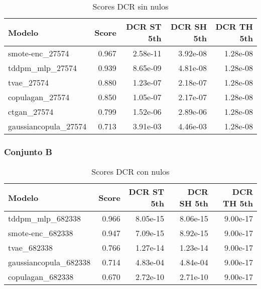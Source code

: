    \begin{table}[H]
    \centering
    \caption{Scores DCR sin nulos}
    \label{dcr-eco-a-scores}
    \begin{tabular}{|l|r|r|r|r|}
        \hline
        \rowcolor[gray]{0.8}
        Modelo & \textbf{Score} & DCR ST 5th & DCR SH 5th & DCR TH 5th \\ \hline
       smote-enc\_27574         & 0.967 & 2.58e-11 & 3.92e-08 & 1.28e-08 \\ \hline
       tddpm\_mlp\_27574        & 0.939 & 8.65e-09 & 4.81e-08 & 1.28e-08 \\ \hline
       tvae\_27574              & 0.880 & 1.23e-07 & 2.18e-07 & 1.28e-08 \\ \hline
       copulagan\_27574         & 0.850 & 1.05e-07 & 2.17e-07 & 1.28e-08 \\ \hline
       ctgan\_27574             & 0.799 & 1.52e-06 & 2.89e-06 & 1.28e-08 \\ \hline
       gaussiancopula\_27574    & 0.713 & 3.91e-03 & 4.46e-03 & 1.28e-08 \\ \hline
    \end{tabular}
\end{table}


\subsubsection{Conjunto B}
\label{ds-conjunto-b}

\begin{table}[H]
    \centering
    \caption{Scores DCR con nulos}
    \label{dcr-eco-b-scores}
    \begin{tabular}{|l|r|r|r|r|}
        \hline
        \rowcolor[gray]{0.8}
        Modelo & \textbf{Score} & DCR ST 5th & DCR SH 5th & DCR TH 5th \\ \hline
        tddpm\_mlp\_682338          & 0.966 & 8.05e-15 & 8.06e-15 & 9.00e-17 \\ \hline
        smote-enc\_682338           & 0.947 & 7.09e-15 & 8.92e-15 & 9.00e-17 \\ \hline
        tvae\_682338                & 0.766 & 1.27e-14 & 1.23e-14 & 9.00e-17 \\ \hline
        gaussiancopula\_682338      & 0.714 & 4.83e-04 & 4.84e-04 & 9.00e-17 \\ \hline
        copulagan\_682338           & 0.670 & 2.72e-10 & 2.71e-10 & 9.00e-17 \\ \hline
    \end{tabular}
\end{table}

